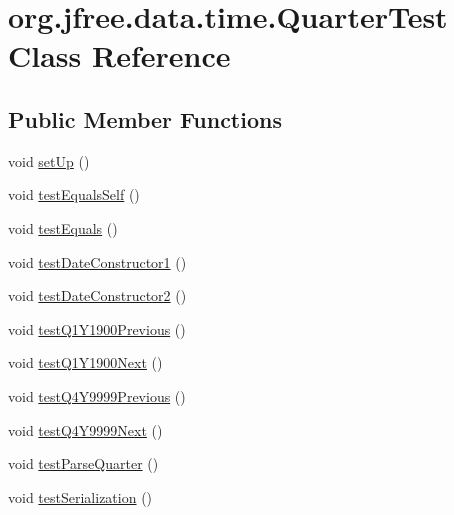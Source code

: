 \hypertarget{classorg_1_1jfree_1_1data_1_1time_1_1_quarter_test}{}\section{org.\+jfree.\+data.\+time.\+Quarter\+Test Class Reference}
\label{classorg_1_1jfree_1_1data_1_1time_1_1_quarter_test}
\subsection*{Public Member Functions}
\begin{DoxyCompactItemize}
\item 
void \mbox{\hyperlink{classorg_1_1jfree_1_1data_1_1time_1_1_quarter_test_aba0dfb876ce5768421016d37e671028f}{set\+Up}} ()
\item 
void \mbox{\hyperlink{classorg_1_1jfree_1_1data_1_1time_1_1_quarter_test_a775e10407e3432243c98205b934af6cf}{test\+Equals\+Self}} ()
\item 
void \mbox{\hyperlink{classorg_1_1jfree_1_1data_1_1time_1_1_quarter_test_ae6d9d8c92c19937ea5e04d3eb1ff196f}{test\+Equals}} ()
\item 
void \mbox{\hyperlink{classorg_1_1jfree_1_1data_1_1time_1_1_quarter_test_a8c5b801caebcb297821005b534b46180}{test\+Date\+Constructor1}} ()
\item 
void \mbox{\hyperlink{classorg_1_1jfree_1_1data_1_1time_1_1_quarter_test_afa26a4a1870157425a8657de72397cc2}{test\+Date\+Constructor2}} ()
\item 
void \mbox{\hyperlink{classorg_1_1jfree_1_1data_1_1time_1_1_quarter_test_a063d6ee2d5923ae8a7d5f02e3c21939c}{test\+Q1\+Y1900\+Previous}} ()
\item 
void \mbox{\hyperlink{classorg_1_1jfree_1_1data_1_1time_1_1_quarter_test_a900ec0d8f2135d97009522f1d0c98e56}{test\+Q1\+Y1900\+Next}} ()
\item 
void \mbox{\hyperlink{classorg_1_1jfree_1_1data_1_1time_1_1_quarter_test_a6a2907baece641ed9f17e6d69ea535fa}{test\+Q4\+Y9999\+Previous}} ()
\item 
void \mbox{\hyperlink{classorg_1_1jfree_1_1data_1_1time_1_1_quarter_test_a012fc1088523232c78fbad116920488c}{test\+Q4\+Y9999\+Next}} ()
\item 
void \mbox{\hyperlink{classorg_1_1jfree_1_1data_1_1time_1_1_quarter_test_a876c013f7c505f5e6803b7c31e5698ca}{test\+Parse\+Quarter}} ()
\item 
void \mbox{\hyperlink{classorg_1_1jfree_1_1data_1_1time_1_1_quarter_test_aac0234dc6db0d990395c2490f11e77fe}{test\+Serialization}} ()

\end{DoxyCompactItemize}
